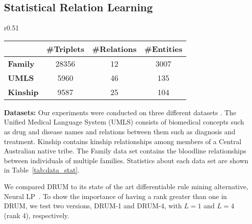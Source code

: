 \documentclass{article}
\begin{document}
\vspace{5pt}

\subsection{Statistical Relation Learning}
\label{sec:srl}


\begin{wraptable}{r}{0.51\textwidth}
\vspace{-20pt}
\caption{Dataset statistics for statistical relation learning}\label{tab:data_stat}
\begin{tabular}{lccc}
\toprule
& \textbf{\#Triplets} & \textbf{\#Relations} & \textbf{\#Entities} \\ 
\midrule
\textbf{Family}  & 28356                & 12                    & 3007               \\
\textbf{UMLS}    & 5960                 & 46                    & 135                \\
\textbf{Kinship} & 9587                 & 25                    & 104                \\
\bottomrule
\end{tabular}
\end{wraptable} 

\textbf{Datasets:} Our experiments were conducted on three different datasets \cite{kok2007statistical}. The Unified Medical Language System (UMLS) consists of biomedical concepts such as drug and disease names and relations between them such as diagnosis and treatment. Kinship contains kinship relationships among members of a Central Australian native tribe. The Family data set contains the bloodline relationships between individuals of multiple families. Statistics about each data set are shown in  Table~\ref{tab:data_stat}.

\vspace{5pt}

\label{sec:drum_vs_rulemining}

We compared DRUM to its state of the art differentiable rule mining alternative, Neural LP~\cite{yang2017differentiable}. To show the importance of having a rank greater than one in DRUM, we test two versions, DRUM-1 and DRUM-4, with $L=1$ and $L=4$ (rank 4), respectively. 
\end{document}

